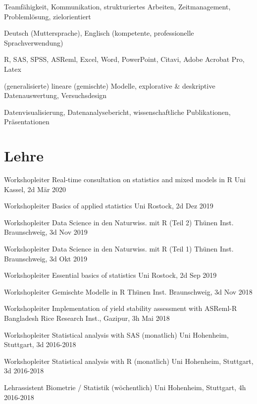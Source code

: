 \documentclass[11pt, a4paper]{awesome-cv}
\begin{document}
\begin{cvskills}

  {Teamfähigkeit, Kommunikation, strukturiertes Arbeiten, Zeitmanagement, Problemlösung, zielorientiert} 
  
  {Deutsch (Muttersprache), Englisch (kompetente, professionelle Sprachverwendung)}
  
  {R, SAS, SPSS, ASReml, Excel, Word, PowerPoint, Citavi, Adobe Acrobat Pro, Latex} 
  
  {(generalisierte) lineare (gemischte) Modelle, explorative \& deskriptive Datenauswertung, Versuchsdesign} 
  
  {Datenvisualisierung, Datenanalysebericht, wissenschaftliche Publikationen, Präsentationen} 
  

\end{cvskills}

\hypertarget{lehre}{%
\section{Lehre}\label{lehre}}

\begin{cvhonors}

  \cvhonor
    {Workshopleiter  }
    {Real-time consultation on statistics and mixed models in R}
    {Uni Kassel, 2d}
    {Mär 2020  }
    
  \cvhonor
    {Workshopleiter  }
    {Basics of applied statistics}
    {Uni Rostock, 2d}
    {Dez 2019  }
  
  \cvhonor
    {Workshopleiter  }
    {Data Science in den Naturwiss. mit R (Teil 2)}
    {Thünen Inst. Braunschweig, 3d}
    {Nov 2019  }    

  \cvhonor
    {Workshopleiter  }
    {Data Science in den Naturwiss. mit R (Teil 1)}
    {Thünen Inst. Braunschweig, 3d}
    {Okt 2019  }      

  \cvhonor
    {Workshopleiter  }
    {Essential basics of statistics}
    {Uni Rostock, 2d}
    {Sep 2019  }  

  \cvhonor
    {Workshopleiter  }
    {Gemischte Modelle in R}
    {Thünen Inst. Braunschweig, 3d}
    {Nov 2018  }  
    
  \cvhonor
    {Workshopleiter  }
    {Implementation of yield stability assessment with ASReml-R}
    {Bangladesh Rice Research Inst., Gazipur, 3h}
    {Mai 2018  }
    
  \cvhonor
    {Workshopleiter  }
    {Statistical analysis with SAS (monatlich)}
    {Uni Hohenheim, Stuttgart, 3d}
    {2016-2018  }
    
  \cvhonor
    {Workshopleiter  }
    {Statistical analysis with R (monatlich)}
    {Uni Hohenheim, Stuttgart, 3d}
    {2016-2018  }
    
  \cvhonor
    {Lehrassistent  }
    {Biometrie / Statistik (wöchentlich)}
    {Uni Hohenheim, Stuttgart, 4h}
    {2016-2018  }
        
\end{cvhonors}
\end{document}
